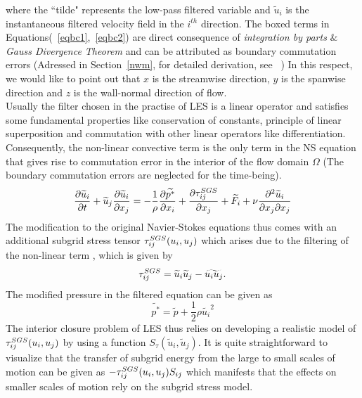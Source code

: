 where the ``tilde" represents the low-pass filtered variable and $\widetilde{u}_i$ is the instantaneous filtered velocity field in the $i^{th}$ direction. The boxed terms in Equations(~\ref{eqbc1},~\ref{eqbc2}) are direct consequence of \textit{integration by parts} $\&$ \textit{Gauss Divergence Theorem} and can be attributed as boundary commutation errors (Adressed in Section~\ref{nwm}, for detailed derivation, see ~\cite{bers}) In this respect, we would like to point out that $x$ is the streamwise direction, $y$ is the spanwise direction and $z$ is the wall-normal direction of flow.\\

Usually the filter chosen in the practise of LES is a linear operator and satisfies some fundamental properties like conservation of constants, principle of linear superposition and commutation with other linear operators like differentiation. Consequently, the non-linear convective term is the only term in the NS equation that gives rise to commutation error in the interior of the flow domain $\Omega$ (The boundary commutation errors are neglected for the time-being).
\begin{equation}
\frac{\partial \widetilde{u}_i}{\partial t} + \widetilde{u}_j\frac{\partial \widetilde{u}_i}{\partial x_j} = -\frac{1}{\rho}\frac{\partial \widetilde{p^{*}}}{\partial x_i} + \frac{\partial \tau^{\small SGS}_{ij}}{\partial x_j} + \widetilde{F_{i}} + \nu\frac{\partial^2\widetilde{u}_i}{\partial x_j \partial x_j} \label{leseq2}
\end{equation}
The modification to the original Navier-Stokes equations thus comes with an additional subgrid stress tensor $\tau^{\tiny SGS}_{ij}(u_i,u_j)$ which arises due to the filtering of the non-linear term , which is given by
\begin{equation}
\tau^{\tiny SGS}_{ij} =  \widetilde{u}_i\widetilde{u}_j - \widetilde{{u}_i{u}_j}.
\end{equation}
The modified pressure in the filtered equation can be given as
\begin{equation}
\widetilde{p^{*}} = \widetilde{p} + \frac{1}{2}\rho\widetilde{u_i}^2
\end{equation}
The interior closure problem of LES thus relies on developing a realistic model of $\tau^{\tiny SGS}_{ij}(u_i,u_j)$ by using a function $S_{\tau}(\widetilde{u}_i,\widetilde{u}_j)$. It is quite straightforward to visualize that the transfer of subgrid energy from the large to small scales of motion can be given as $-\tau^{\tiny SGS}_{ij}(u_i,u_j)S_{ij}$ which manifests that the effects on smaller scales of motion rely on the subgrid stress model.\\

